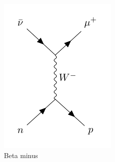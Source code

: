 \begin{figure}[H]
\centering
\begin{subfigure}[b]{0.28\textwidth}
    \centering
    \includegraphics[width=\linewidth]{figures/assets/feyman_graphs/CCQE.pdf}
\caption{Beta minus}
    \label{plot:ccqe_p}
  \end{subfigure}
\begin{subfigure}[b]{0.28\textwidth}
    \centering

\end{subfigure}
\end{figure}

